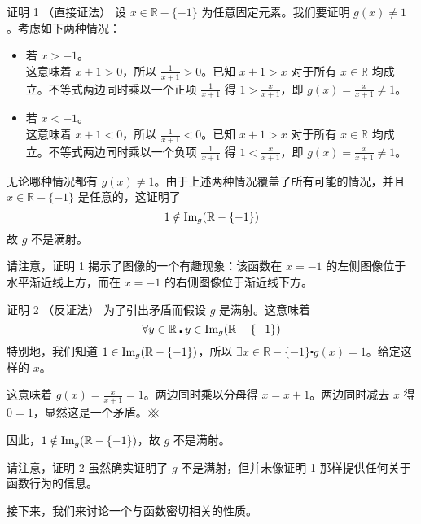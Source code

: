 \begin{example}
    \begin{proofs}{证明 1 （直接证法）}
        设 $x \in \mathbb{R} - \{-1\}$ 为任意固定元素。我们要证明 $g(x) \ne 1$。考虑如下两种情况：
        \begin{itemize}
            \item 若 $x > -1$。\\
                  这意味着 $x+1>0$，所以 $\frac{1}{x+1}>0$。已知 $x+1>x$ 对于所有 $x \in \mathbb{R}$ 均成立。不等式两边同时乘以一个正项 $\frac{1}{x+1}$ 得 $1 > \frac{x}{x+1}$，即 $g(x) = \frac{x}{x+1} \ne 1$。
            \item 若 $x < -1$。\\
                  这意味着 $x+1<0$，所以 $\frac{1}{x+1}<0$。已知 $x+1>x$ 对于所有 $x \in \mathbb{R}$ 均成立。不等式两边同时乘以一个负项 $\frac{1}{x+1}$ 得 $1 < \frac{x}{x+1}$，即 $g(x) =  \frac{x}{x+1} \ne 1$。
        \end{itemize}
        无论哪种情况都有 $g(x) \ne 1$。由于上述两种情况覆盖了所有可能的情况，并且 $x \in \mathbb{R} - \{-1\}$ 是任意的，这证明了
        \[1 \notin \text{Im}_g(\mathbb{R} - \{-1\})\]
        故 $g$ 不是满射。
    \end{proofs}

    请注意，证明 1 揭示了图像的一个有趣现象：该函数在 $x = -1$ 的左侧图像位于水平渐近线上方，而在 $x = -1$ 的右侧图像位于渐近线下方。

    \begin{proofs}{证明 2 （反证法）}
        为了引出矛盾而假设 $g$ 是满射。这意味着
        \[\forall y \in \mathbb{R} \centerdot y \in \text{Im}_g(\mathbb{R} - \{-1\})\]
        特别地，我们知道 $1 \in \text{Im}_g(\mathbb{R} - \{-1\})$，所以 $\exists x \in \mathbb{R} - \{-1\} \centerdot g(x) = 1$。给定这样的 $x$。

        这意味着 $g(x) = \frac{x}{x+1} = 1$。两边同时乘以分母得 $x = x + 1$。两边同时减去 $x$ 得 $0 = 1$，显然这是一个矛盾。$\hashx$

        因此，$1 \notin \text{Im}_g(\mathbb{R} - \{-1\})$，故 $g$ 不是满射。
    \end{proofs}

    请注意，证明 2 虽然确实证明了 $g$ 不是满射，但并未像证明 1 那样提供任何关于函数行为的信息。
\end{example}

接下来，我们来讨论一个与函数密切相关的性质。
